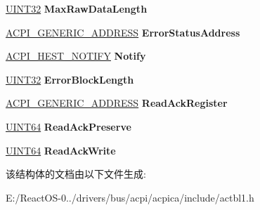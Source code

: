 \begin{DoxyCompactItemize}
\hyperlink{_processor_bind_8h_ae1e6edbbc26d6fbc71a90190d0266018}{U\+I\+N\+T32} {\bfseries Max\+Raw\+Data\+Length}
\item 
\mbox{\label{structacpi__hest__generic__v2_a57224d1915f6b560ea2018c5ddf547a8}} 
\hyperlink{structacpi__generic__address}{A\+C\+P\+I\+\_\+\+G\+E\+N\+E\+R\+I\+C\+\_\+\+A\+D\+D\+R\+E\+SS} {\bfseries Error\+Status\+Address}
\item 
\mbox{\label{structacpi__hest__generic__v2_a4098b8b2002a260202314e6dc49249dc}} 
\hyperlink{structacpi__hest__notify}{A\+C\+P\+I\+\_\+\+H\+E\+S\+T\+\_\+\+N\+O\+T\+I\+FY} {\bfseries Notify}
\item 
\mbox{\label{structacpi__hest__generic__v2_ad4cb19616b85f96f18aaf49ce723fa50}} 
\hyperlink{_processor_bind_8h_ae1e6edbbc26d6fbc71a90190d0266018}{U\+I\+N\+T32} {\bfseries Error\+Block\+Length}
\item 
\mbox{\label{structacpi__hest__generic__v2_a086096d9144238d920cb7f51cf1d5f68}} 
\hyperlink{structacpi__generic__address}{A\+C\+P\+I\+\_\+\+G\+E\+N\+E\+R\+I\+C\+\_\+\+A\+D\+D\+R\+E\+SS} {\bfseries Read\+Ack\+Register}
\item 
\mbox{\label{structacpi__hest__generic__v2_a211c344861160cb49976054e8c78acdc}} 
\hyperlink{_processor_bind_8h_a57be03562867144161c1bfee95ca8f7c}{U\+I\+N\+T64} {\bfseries Read\+Ack\+Preserve}
\item 
\mbox{\label{structacpi__hest__generic__v2_a4f1eaacd13a66146f4763cde9f9dc626}} 
\hyperlink{_processor_bind_8h_a57be03562867144161c1bfee95ca8f7c}{U\+I\+N\+T64} {\bfseries Read\+Ack\+Write}
\end{DoxyCompactItemize}


该结构体的文档由以下文件生成\+:\begin{DoxyCompactItemize}
\item 
E\+:/\+React\+O\+S-\/0../drivers/bus/acpi/acpica/include/actbl1.\+h\end{DoxyCompactItemize}
